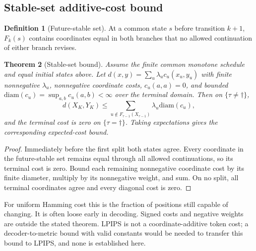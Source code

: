 \documentclass[11pt,a4paper]{article}
\theoremstyle{plain}
\newtheorem{theorem}{Theorem}[section]
\theoremstyle{definition}
\newtheorem{definition}[theorem]{Definition}
\theoremstyle{remark}
\newcommand{\diam}{\mathrm{diam}}
\begin{document}
\subsection{Stable-set additive-cost bound}
\begin{definition}[Future-stable set]
At a common state $s$ before transition $k+1$, $F_k(s)$ contains coordinates equal
in both branches that no allowed continuation of either branch revises.
\end{definition}
\begin{theorem}[Stable-set bound]
\label{thm:stableset}
Assume the finite common monotone schedule and equal initial states above.
Let $d(x,y)=\sum_u\lambda_uc_u(x_u,y_u)$ with finite nonnegative
$\lambda_u$, nonnegative coordinate costs, $c_u(a,a)=0$, and bounded
$\diam(c_u)=\sup_{a,b}c_u(a,b)<\infty$ over the terminal domain.
Then on $\{\tau\neq\dagger\}$,
\[
 d(X_K,Y_K)\leq \sum_{u\notin F_{\tau-1}(X_{\tau-1})}\lambda_u\diam(c_u),
\]
and the terminal cost is zero on $\{\tau=\dagger\}$. Taking expectations
gives the corresponding expected-cost bound.
\end{theorem}
\begin{proof}
Immediately before the first split both states agree. Every coordinate in the
future-stable set remains equal through all allowed continuations, so its
terminal cost is zero. Bound each remaining nonnegative coordinate cost by its
finite diameter, multiply by its nonnegative weight, and sum. On no split,
all terminal coordinates agree and every diagonal cost is zero.
\end{proof}
For uniform Hamming cost this is the fraction of positions still capable of
changing. It is often loose early in decoding. Signed costs and negative weights
are outside the stated theorem. LPIPS is not a coordinate-additive token cost;
a decoder-to-metric bound with valid constants would be needed to transfer this
bound to LPIPS, and none is established here.
\end{document}
